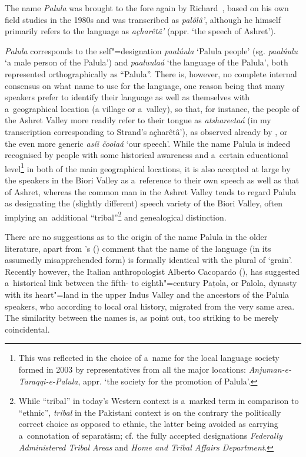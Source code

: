 The name \textit{Palula} was brought to the fore again by Richard~\citet{strand1997/2015}, based on
his own field studies in the 1980s and was transcribed as \textit{palôlâ'}, although he himself primarily
refers to the language as \textit{açharêtâ'} (appr. `the speech of Ashret').


\textit{Palula} corresponds to the self"=designation \textit{paalúula} `Palula people'
(sg. \textit{paalúulu} `a male person of the Palula') and \textit{paaluulaá} `the language
of the Palula', both represented orthographically as ``Palula''. There is, however, no complete
internal consensus on what name to use for the language, one reason being that many speakers prefer
to identify their language as well as themselves with a~geographical location (a village or
a~valley), so that, for instance, the people of the Ashret Valley more readily refer to their tongue
as \textit{atshareetaá} (in my transcription corresponding to Strand's
açharêtâ'), as observed already by \citet{morgenstierne1941}, or the even more
generic \textit{asíi čoolaá} `our speech'. While the name Palula is indeed recognised by
people with some historical awareness and a~certain educational level\footnote{This was reflected in
  the choice of a~name for the local language society formed in 2003 by representatives from all the
  major locations: \textit{Anjuman-e-Taraqqi-e-Palula}, appr. `the society for the promotion of
  Palula'.} in both of the main geographical locations, it is also accepted at large by the speakers
in the Biori Valley as a~reference to their own speech as well as that of Ashret, whereas the common
man in the Ashret Valley tends to regard Palula as designating the (slightly different) speech
variety of the Biori Valley, often implying an~additional ``tribal''\footnote{While ``tribal'' in
  today's Western context is a~marked term in comparison to ``ethnic'', \textit{tribal} in the
  Pakistani context is on the contrary the politically correct choice as opposed to ethnic, the
  latter being avoided as carrying a~connotation of separatism; cf. the fully accepted designations
  \textit{Federally Administered Tribal Areas} and \textit{Home and Tribal Affairs Department}.} and
genealogical distinction.


There are no suggestions as to the origin of the name Palula in the older literature, apart from \citeauthor{morgenstierne1941}'s (\citeyear[53]{morgenstierne1941}) comment that the name of the language (in its assumedly misapprehended form) is formally identical with the plural of `grain'. Recently however, the Italian anthropologist Alberto Cacopardo (\citeyear[91]{cacopardo2001}), has suggested a~historical link between the fifth- to eighth"=century Paṭola, or Palola, dynasty with its heart"=land in the upper Indus Valley and the ancestors of the Palula speakers, who according to local oral history, migrated from the very same area. The similarity between the names is, as \citet[3]{schmidtkohistani2008} point out, too striking to be merely coincidental.


